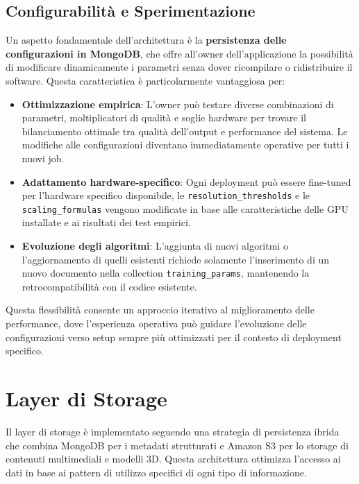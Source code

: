\subsection{Configurabilità e Sperimentazione}

Un aspetto fondamentale dell'architettura è la \textbf{persistenza delle configurazioni in MongoDB}, che offre all'owner dell'applicazione la possibilità di modificare dinamicamente i parametri senza dover ricompilare o ridistribuire il software. Questa caratteristica è particolarmente vantaggiosa per:

\begin{itemize}
	\item \textbf{Ottimizzazione empirica}: L'owner può testare diverse combinazioni di parametri, moltiplicatori di qualità e soglie hardware per trovare il bilanciamento ottimale tra qualità dell'output e performance del sistema. Le modifiche alle configurazioni diventano immediatamente operative per tutti i nuovi job.
	
	\item \textbf{Adattamento hardware-specifico}: Ogni deployment può essere fine-tuned per l'hardware specifico disponibile, le \texttt{resolution\_thresholds} e le \texttt{scaling\_formulas} vengono modificate in base alle caratteristiche delle GPU installate e ai risultati dei test empirici.
	
	\item \textbf{Evoluzione degli algoritmi}: L'aggiunta di nuovi algoritmi o l'aggiornamento di quelli esistenti richiede solamente l'inserimento di un nuovo documento nella collection \texttt{training\_params}, mantenendo la retrocompatibilità con il codice esistente.
\end{itemize}

Questa flessibilità consente un approccio iterativo al miglioramento delle performance, dove l'esperienza operativa può guidare l'evoluzione delle configurazioni verso setup sempre più ottimizzati per il contesto di deployment specifico.

\section{Layer di Storage}

Il layer di storage è implementato seguendo una strategia di persistenza ibrida che combina MongoDB per i metadati strutturati e Amazon S3 per lo storage di contenuti multimediali e modelli 3D. Questa architettura ottimizza l'accesso ai dati in base ai pattern di utilizzo specifici di ogni tipo di informazione.

